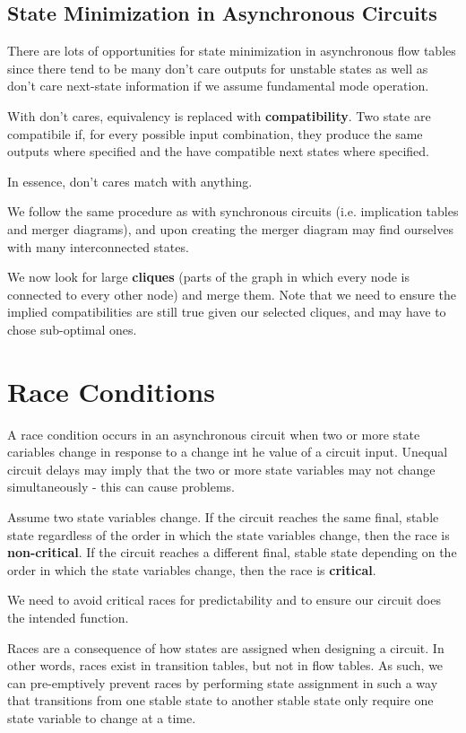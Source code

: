 \documentclass[12pt]{article}
\begin{document}
\subsection*{State Minimization in Asynchronous Circuits}
There are lots of opportunities for state minimization in asynchronous flow tables since there tend to be many don't care outputs for unstable states as well as don't care next-state information if we assume fundamental mode operation.

With don't cares, equivalency is replaced with {\bf compatibility}. Two state are compatibile if, for every possible input combination, they produce the same outputs where specified and the have compatible next states where specified.

In essence, don't cares match with anything.

We follow the same procedure as with synchronous circuits (i.e. implication tables and merger diagrams), and upon creating the merger diagram may find ourselves with many interconnected states.

We now look for large {\bf cliques} (parts of the graph in which every node is connected to every other node) and merge them. Note that we need to ensure the implied compatibilities are still true given our selected cliques, and may have to chose sub-optimal ones.

\section*{Race Conditions}
A race condition occurs in an asynchronous circuit when two or more state cariables change in response to a change int he value of a circuit input. Unequal circuit delays may imply that the two or more state variables may not change simultaneously - this can cause problems.

Assume two state variables change. If the circuit reaches the same final, stable state regardless of the order in which the state variables change, then the race is {\bf non-critical}. If the circuit reaches a different final, stable state depending on the order in which the state variables change, then the race is {\bf critical}.

We need to avoid critical races for predictability and to ensure our circuit does the intended function.

Races are a consequence of how states are assigned when designing a circuit. In other words, races exist in transition tables, but not in flow tables. As such, we can pre-emptively prevent races by performing state assignment in such a way that transitions from one stable state to another stable state only require one state variable to change at a time.
\end{document}
